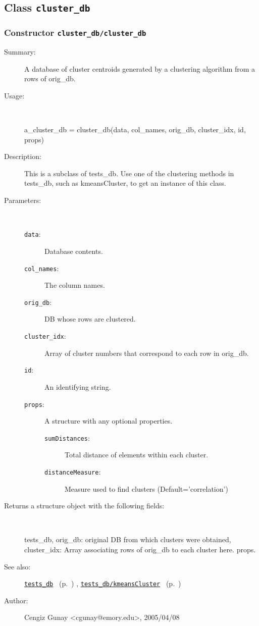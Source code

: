 \subsection{Class \texttt{cluster\_db}}%
%
\label{ref_cluster_db}%
\hypertarget{ref_cluster_db}{}%
\subsubsection[Constructor \texttt{cluster\_db}]{Constructor \texttt{cluster\_db/cluster\_db}}%
%
\label{ref_cluster_db__cluster_db}%
\hypertarget{ref_cluster_db__cluster_db}{}%
\begin{description}
\item[Summary:]A database of cluster centroids generated by a clustering algorithm from a rows of orig\_db.
%
\item[Usage:]~%
\begin{lyxcode}%
a\_cluster\_db = cluster\_db(data, col\_names, orig\_db, cluster\_idx, id, props)
%
\end{lyxcode}%
%
\item[Description:]%
This is a subclass of tests\_db. Use one of the clustering methods in 
 tests\_db, such as kmeansCluster, to get an instance of this class.
\item[Parameters:]~
\begin{description}%
\item[\texttt{data}:]
 Database contents.
\item[\texttt{col\_names}:]
 The column names.
\item[\texttt{orig\_db}:]
 DB whose rows are clustered.
\item[\texttt{cluster\_idx}:]
 Array of cluster numbers that correspond to each row in orig\_db.
\item[\texttt{id}:]
 An identifying string.
\item[\texttt{props}:]
 A structure with any optional properties.
\begin{description}%
\item[\texttt{sumDistances}:]
 Total distance of elements within each cluster.
\item[\texttt{distanceMeasure}:]
 Measure used to find clusters (Default='correlation')
\end{description}%
\end{description}%
%
\item[Returns a structure object with the following fields:]~

	tests\_db, 
	orig\_db: original DB from which clusters were obtained, 
	cluster\_idx: Array associating rows of orig\_db to each cluster here.
	props.
%
%
\item[See also:]%
\hyperlink{ref_tests_db}{\texttt{tests\_db}}%
\ (p.~\pageref{ref_tests_db})%
%
, \hyperlink{ref_tests_db__kmeansCluster}{\texttt{tests\_db/kmeansCluster}}%
\ (p.~\pageref{ref_tests_db__kmeansCluster})%
%
%
\item[Author:]%
Cengiz Gunay <cgunay@emory.edu>, 2005/04/08%
\end{description}
\methodline%
